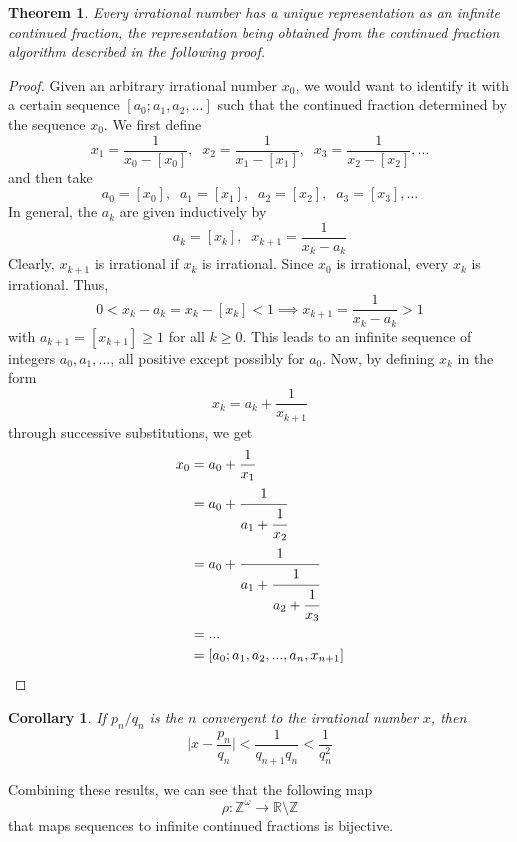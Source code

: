 \documentclass{article}
\newtheorem{theorem}{Theorem}[section]
\newtheorem{corollary}{Corollary}[theorem]
\theoremstyle{remark}
\theoremstyle{definition}
\begin{document}
\begin{theorem}
Every irrational number has a unique representation as an infinite continued fraction, the representation being obtained from the continued fraction algorithm described in the following proof. 
\end{theorem}
\begin{proof} Given an arbitrary irrational number $x_0$, we would want to identify it with a certain sequence $[a_0; a_1, a_2, ...]$ such that the continued fraction determined by the sequence $x_0$. We first define 
\[x_1 = \frac{1}{x_0 - [x_0]}, \;\; x_2 = \frac{1}{x_1 - [x_1]}, \;\; x_3 = \frac{1}{x_2 - [x_2]}, ...\]
and then take 
\[a_0 = [x_0], \;\; a_1 = [x_1], \;\; a_2 = [x_2], \;\; a_3 = [x_3], ...\]
In general, the $a_k$ are given inductively by
\[a_k = [x_k], \;\; x_{k+1} = \frac{1}{x_k - a_k}\]
Clearly, $x_{k+1}$ is irrational if $x_k$ is irrational. Since $x_0$ is irrational, every $x_k$ is irrational. Thus, 
\[0 < x_k  - a_k = x_k - [x_k] < 1 \implies x_{k+1} = \frac{1}{x_k - a_k} > 1\]
with $a_{k+1} = [x_{k+1}] \geq 1$ for all $k \geq 0$. This leads to an infinite sequence of integers $a_0, a_1, ...$, all positive except possibly for $a_0$. Now, by defining $x_k$ in the form 
\[x_k = a_k + \frac{1}{x_{k+1}}\]
through successive substitutions, we get
\begin{align*}
    x_0 & = a_0 + \frac{1}{x_1} \\ 
    & = a_0 + \cfrac{1}{a_1 + \cfrac{1}{x_2}} \\
    & = a_0 + \cfrac{1}{a_1 + \cfrac{1}{a_2 + \cfrac{1}{x_3}}} \\
    & = ... \\
    & = [a_0 ; a_1, a_2, ..., a_n, x_{n+1}]
\end{align*}
\end{proof}

\begin{corollary}
If $p_n / q_n$ is the $n$ convergent to the irrational number $x$, then 
\[\bigg| x - \frac{p_n}{q_n} \bigg| < \frac{1}{q_{n+1} q_n} < \frac{1}{q_n^2}\]
\end{corollary}

Combining these results, we can see that the following map 
\[\rho: \mathbb{Z}^\omega \longrightarrow \mathbb{R} \setminus \mathbb{Z}\]
that maps sequences to infinite continued fractions is bijective. 
\end{document}
